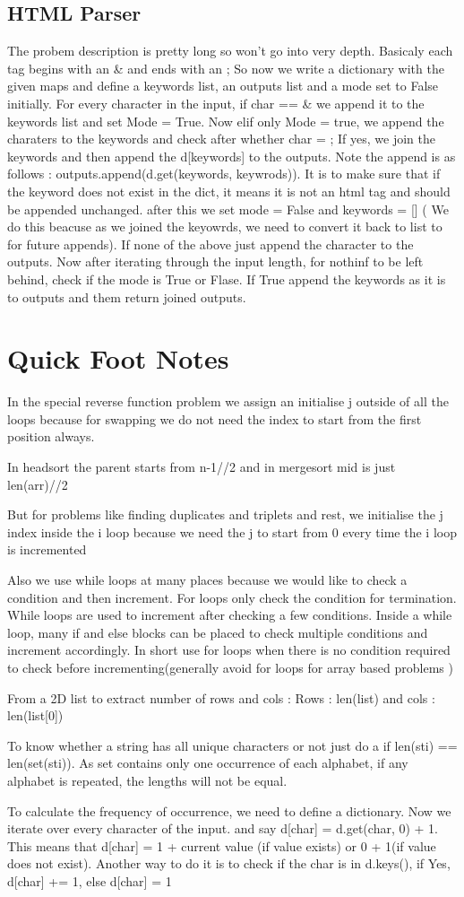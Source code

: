 \documentclass{article}
\newcommand{\nd}{\noindent}
\begin{document}
\subsection{HTML Parser}
The probem description is pretty long so won't go into very depth. Basicaly each tag begins with an \& and ends with an ; So now we write a dictionary with the given maps and define a keywords list, an outputs list and a mode set to False initially. For every character in the input, if char == \& we append it to the keywords list and set Mode = True. Now elif only Mode = true, we append the charaters to the keywords and check after whether char = ; If yes, we join the keywords and then append the d[keywords] to the outputs. Note the append is as follows : outputs.append(d.get(keywords, keywrods)). It is to make sure that if the keyword does not exist in the dict, it means it is not an html tag and should be appended unchanged. after this we set mode = False and keywords = [] ( We do this beacuse as we joined the keyowrds, we need to convert it back to list to for future appends). If none of the above just append the character to the outputs. Now after iterating through the input length, for nothinf to be left behind, check if the mode is True or Flase. If True append the keywords as it is to outputs and them return joined outputs.
\newpage 
\section {Quick Foot Notes }
In the special reverse function problem we assign an initialise j outside of all the loops because for swapping we do not need the index to start from the first position always. 

\nd In headsort the parent starts from n-1//2 and in mergesort mid is just len(arr)//2

\nd But for problems like finding duplicates and triplets and rest, we initialise the j index inside the i loop because we need the j to start from 0 every time the i loop is incremented

\nd Also we use while loops at many places because we would like to check a condition and then increment. For loops only check the condition for termination. While loops are used to increment after checking a few conditions. Inside a while loop, many if and else blocks can be placed to check multiple conditions and increment accordingly. In short use for loops when there is no condition required to check before incrementing(generally avoid for loops for array based problems )

\nd From a 2D list to extract number of rows and cols : Rows : len(list) and cols : len(list[0])

\nd To know whether a string has all unique characters or not just do a if len(sti) == len(set(sti)). As set contains only one occurrence of each alphabet, if any alphabet is repeated, the lengths will not be equal. 

\nd To calculate the frequency of occurrence, we need to define a dictionary. Now we iterate over every character of the input. and say d[char] = d.get(char, 0) + 1. This means that d[char] = 1 + current value (if value exists) or 0 + 1(if value does not exist). Another way to do it is to check if the char is in d.keys(), if Yes, d[char] += 1, else d[char] = 1 
\end{document}
